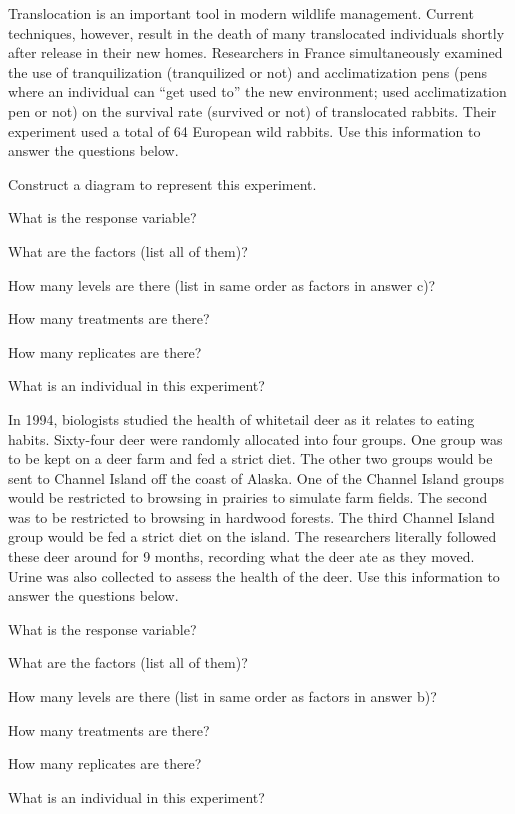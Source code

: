 \documentclass[10pt,openany]{book}\usepackage[]{graphicx}\usepackage[]{color}
\begin{document}
\begin{exsection}
  \item \label{revex:ExpDTrans} Translocation is an important tool in modern wildlife management. Current techniques, however, result in the death of many translocated individuals shortly after release in their new homes. Researchers in France \citep{Lettyetal2000} simultaneously examined the use of tranquilization (tranquilized or not) and acclimatization pens (pens where an individual can ``get used to'' the new environment; used acclimatization pen or not) on the survival rate (survived or not) of translocated rabbits. Their experiment used a total of 64 European wild rabbits. Use this information to answer the questions below. 
\begin{Enumerate}
  \item Construct a diagram to represent this experiment.
  \item What is the response variable?
  \item What are the factors (list all of them)?
  \item How many levels are there (list in same order as factors in answer c)?
  \item How many treatments are there?
  \item How many replicates are there?
  \item What is an individual in this experiment?
\end{Enumerate}

  \item \label{revex:ExpDDeerDiet} In 1994, biologists studied the health of whitetail deer as it relates to eating habits. Sixty-four deer were randomly allocated into four groups. One group was to be kept on a deer farm and fed a strict diet. The other two groups would be sent to Channel Island off the coast of Alaska. One of the Channel Island groups would be restricted to browsing in prairies to simulate farm fields. The second was to be restricted to browsing in hardwood forests. The third Channel Island group would be fed a strict diet on the island. The researchers literally followed these deer around for 9 months, recording what the deer ate as they moved. Urine was also collected to assess the health of the deer. Use this information to answer the questions below. 
\begin{Enumerate}
  \item What is the response variable?
  \item What are the factors (list all of them)?
  \item How many levels are there (list in same order as factors in answer b)?
  \item How many treatments are there?
  \item How many replicates are there?
  \item What is an individual in this experiment?
\end{Enumerate}


\end{exsection}
\end{document}
